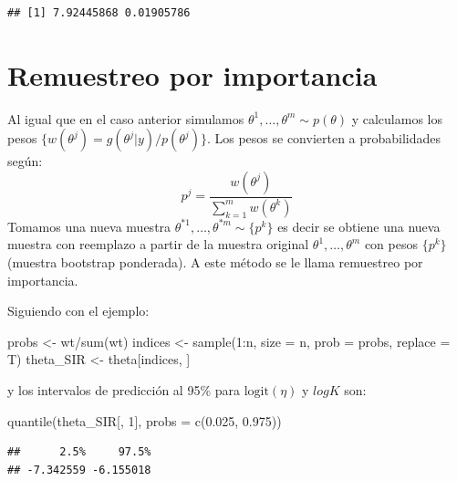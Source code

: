 \documentclass[
  12pt,
]{book}
\newenvironment{Shaded}{\begin{snugshade}}{\end{snugshade}}
\newcommand{\AttributeTok}[1]{\textcolor[rgb]{0.77,0.63,0.00}{#1}}
\newcommand{\DecValTok}[1]{\textcolor[rgb]{0.00,0.00,0.81}{#1}}
\newcommand{\FloatTok}[1]{\textcolor[rgb]{0.00,0.00,0.81}{#1}}
\newcommand{\FunctionTok}[1]{\textcolor[rgb]{0.00,0.00,0.00}{#1}}
\newcommand{\NormalTok}[1]{#1}
\newcommand{\OtherTok}[1]{\textcolor[rgb]{0.56,0.35,0.01}{#1}}
\newcommand{\SpecialCharTok}[1]{\textcolor[rgb]{0.00,0.00,0.00}{#1}}
\theoremstyle{definition}
\theoremstyle{definition}
\theoremstyle{definition}
\theoremstyle{definition}
\theoremstyle{remark}
\begin{document}
\begin{verbatim}
## [1] 7.92445868 0.01905786
\end{verbatim}

\hypertarget{remuestreo-por-importancia}{%
\section{Remuestreo por importancia}\label{remuestreo-por-importancia}}

Al igual que en el caso anterior simulamos \(\theta^1,\ldots,\theta^m\sim p(\theta)\) y calculamos los pesos \(\{w(\theta^j)=g(\theta^j|y)/p(\theta^j)\}\). Los pesos se convierten a probabilidades según:
\[p^j=\frac{w(\theta^j)}{\sum_{k=1}^mw(\theta^k)}\]
Tomamos una nueva muestra \(\theta^{*1},\ldots,\theta^{*m}\sim \{p^k\}\) es decir se obtiene una nueva muestra con reemplazo a partir de la muestra original \(\theta^1,\ldots,\theta^m\) con pesos \(\{p^k\}\) (muestra bootstrap ponderada). A este método se le llama remuestreo por importancia.

Siguiendo con el ejemplo:

\begin{Shaded}
\begin{Highlighting}[]
\NormalTok{probs }\OtherTok{\textless{}{-}}\NormalTok{ wt}\SpecialCharTok{/}\FunctionTok{sum}\NormalTok{(wt)}
\NormalTok{indices }\OtherTok{\textless{}{-}} \FunctionTok{sample}\NormalTok{(}\DecValTok{1}\SpecialCharTok{:}\NormalTok{n, }\AttributeTok{size =}\NormalTok{ n, }\AttributeTok{prob =}\NormalTok{ probs, }\AttributeTok{replace =}\NormalTok{ T)}
\NormalTok{theta\_SIR }\OtherTok{\textless{}{-}}\NormalTok{ theta[indices, ]}
\end{Highlighting}
\end{Shaded}

y los intervalos de predicción al 95\% para \(\text{logit}(\eta)\) y \(log K\) son:

\begin{Shaded}
\begin{Highlighting}[]
\FunctionTok{quantile}\NormalTok{(theta\_SIR[, }\DecValTok{1}\NormalTok{], }\AttributeTok{probs =} \FunctionTok{c}\NormalTok{(}\FloatTok{0.025}\NormalTok{, }\FloatTok{0.975}\NormalTok{))}
\end{Highlighting}
\end{Shaded}

\begin{verbatim}
##      2.5%     97.5% 
## -7.342559 -6.155018
\end{verbatim}
\end{document}

